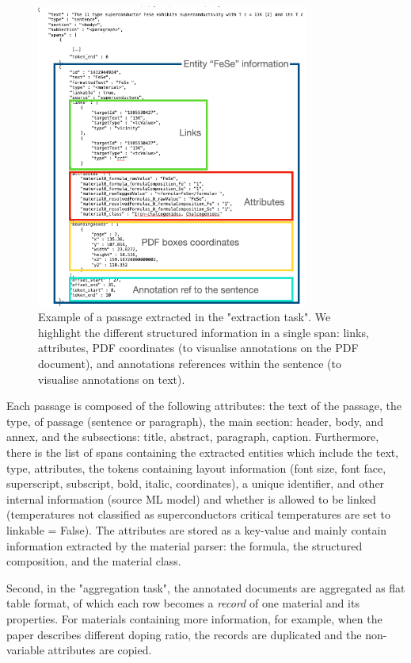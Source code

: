 \documentclass[a4paper]{article}
\begin{document}
\begin{figure}[ht]
  \centering
  \includegraphics[width=0.8\textwidth]{images/data-flow-2} 
  \caption{Example of a passage extracted in the "extraction task". We highlight the different structured information in a single span: links, attributes, PDF coordinates (to visualise annotations on the PDF document), and annotations references within the sentence (to visualise annotations on text).}
  \label{fig:data-flow-2}
\end{figure}

Each passage is composed of the following attributes: the text of the passage, the type, of passage (sentence or paragraph), the main section: header, body, and annex, and the subsections: title, abstract, paragraph, caption. 
Furthermore, there is the list of spans containing the extracted entities which include the text, type, attributes, the tokens containing layout information (font size, font face, superscript, subscript, bold, italic, coordinates), a unique identifier, and other internal information (source ML model) and whether is allowed to be linked (temperatures not classified as superconductors critical temperatures are set to linkable = False).
The attributes are stored as a key-value and mainly contain information extracted by the material parser: the formula, the structured composition, and the material class.  

Second, in the "aggregation task", the annotated documents are aggregated as flat table format, of which each row becomes a \textit{record} of one material and its properties. For materials containing more information, for example, when the paper describes different doping ratio, the records are duplicated and the non-variable attributes are copied. 
\end{document}
